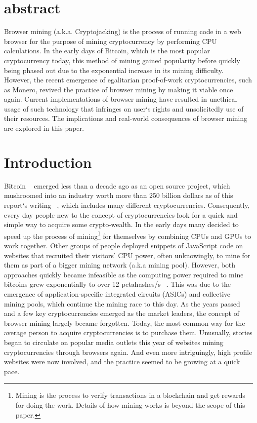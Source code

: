 \section{abstract}

Browser mining (a.k.a. Cryptojacking) is the process of running code in a web browser for the purpose of mining  cryptocurrency by performing CPU calculations. In the early days of Bitcoin, which is the most popular cryptocurrency today, this method of mining gained popularity before quickly being phased out due to the exponential increase in its mining difficulty. However, the recent emergence of egalitarian proof-of-work cryptocurrencies, such as Monero, revived the practice of browser mining by making it viable once again. Current implementations of browser mining have resulted in unethical usage of such technology that infringes on user`s rights and unsolicitedly use of their resources. The implications and real-world consequences of browser mining are explored in this paper.

\section{Introduction}

Bitcoin ~\cite{nakamoto2008bitcoin} emerged less than a decade ago as an open source project, which mushroomed into an industry worth more than 250 billion dollars as of this report`s writing ~\cite{coinmarketcap}, which includes many different cryptocurrencies. Consequently, every day people new to the concept of cryptocurrencies look for a quick and simple way to acquire some crypto-wealth. In the early days many decided to speed up the process of mining\footnote{Mining is the process to verify transactions in a blockchain and get rewards for doing the work. Details of how mining works is beyond the scope of this paper.} for themselves by combining CPUs and GPUs to work together. Other groups of people deployed snippets of JavaScript code on websites that recruited their visitors’ CPU power, often unknowingly, to mine for them as part of a bigger mining network (a.k.a mining pool). However, both approaches quickly became infeasible as the computing power required to mine bitcoins grew exponentially to over 12 petahashes/s ~\cite{blockchaininfohashrate}. This was due to the emergence of application-specific integrated circuits (ASICs) and collective mining pools, which continue the mining race to this day. As the years passed and a few key cryptocurrencies emerged as the market leaders, the concept of browser mining largely became forgotten. Today, the most common way for the average person to acquire cryptocurrencies is to purchase them. Unusually, stories began to circulate on popular media outlets this year of websites mining cryptocurrencies through browsers again. And even more intriguingly, high profile websites were now involved, and the practice seemed to be growing at a quick pace.

